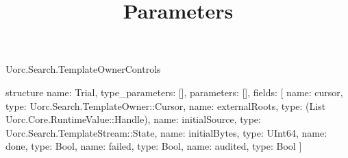 \begin{lexlean}{Uorc.Search.TemplateOwnerControls}
\title{Parameters}
\begin{semanticmodule}
structure{
  name: Trial,
  type_parameters: [],
  parameters: [],
  fields: [
    {name: cursor, type: Uorc.Search.TemplateOwner::Cursor},
    {name: externalRoots, type: (List Uorc.Core.RuntimeValue::Handle)},
    {name: initialSource, type: Uorc.Search.TemplateStream::State},
    {name: initialBytes, type: UInt64},
    {name: done, type: Bool},
    {name: failed, type: Bool},
    {name: audited, type: Bool}
  ]
}


\end{semanticmodule}
\end{lexlean}
